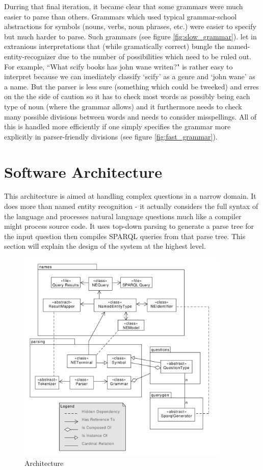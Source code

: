 \documentclass[11pt]{article}
\begin{document}
Durring that final iteration, it became clear that some grammars were much
easier to parse than others. Grammars which used typical grammar-school abstractions
for symbols (nouns, verbs, noun phrases, etc.) were easier to specify but much harder
to parse. Such grammars (see figure \ref{fig:slow_grammar}).
let in extranious interpretations that (while gramatically
correct) bungle the named-entity-recognizer due to the number of possibilities which
need to be ruled out. For example, ``What scify books has john wane writen?" is rather
easy to interpret because we can imediately classify `scify' as a genre and `john wane'
as a name. But the parser is less sure (something which could be tweeked) and erres
on the the side of caution so it has to check most words as possibly being each type
of noun (where the grammar allows) and it furthermore needs to check many possible divisions
between words and needs to consider misspellings. All of this is handled more efficiently 
if one simply specifies the grammar more explicitly in parser-friendly divisions 
(see figure \ref{fig:fast_grammar}).


\section{Software Architecture}

This architecture is aimed at handling complex questions in a narrow domain.
It does more than named entity recognition - it actually considers
the full syntax of the language and processes natural language questions
much like a compiler might process source code. It uses
top-down parsing to generate a parse tree for the input question then
compiles SPARQL queries from that parse tree.
This section will explain the design of the system at the highest level.

\begin{figure}[h!]
    \centering
    \includegraphics[width=0.9\textwidth,natwidth=1,natheight=1]{umlet/architecture.pdf}
    \caption{Architecture}
    \label{fig:arch}
\end{figure}
\end{document}
